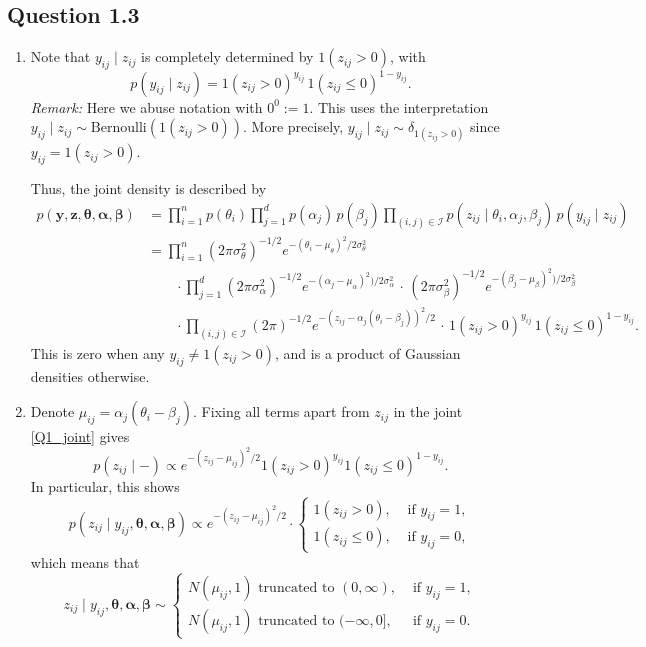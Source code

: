 \documentclass[12pt]{article}
\begin{document}
\subsection*{Question 1.3}

\begin{enumerate}[label=(\alph*)]
    \item Note that $y_{ij} \mid z_{ij}$ is completely determined by $1(z_{ij}
    > 0)$, with \[
        p(y_{ij}\mid z_{ij})
            = 1(z_{ij} > 0)^{y_{ij}}\,1(z_{ij} \leq 0)^{1 - y_{ij}}.
    \]
    \emph{Remark:} Here we abuse notation with $0^0 := 1$.
    This uses the interpretation $y_{ij}\mid z_{ij} \sim
    \text{Bernoulli}(1(z_{ij} > 0))$.
    More precisely, $y_{ij}\mid z_{ij} \sim \delta_{1(z_{ij} > 0)}$ since
    $y_{ij} = 1(z_{ij} > 0)$.

    Thus, the joint density is described by \begin{align*}
        p(\bm{y}, \bm{z}, \bm{\theta}, \bm{\alpha}, \bm{\beta})
            &= \prod_{i = 1}^n p(\theta_i) \prod_{j = 1}^d p(\alpha_j)\,p(\beta_j)
                \prod_{(i, j) \in \mathscr{I}} p(z_{ij}\mid \theta_i, \alpha_j, \beta_j)\,p(y_{ij}\mid z_{ij}) \\
            &= \prod_{i = 1}^n (2\pi\sigma_\theta^2)^{-1 /2} e^{-(\theta_i - \mu_\theta)^2 /2\sigma_\theta^2} \\
                &\qquad\cdot\prod_{j = 1}^d (2\pi\sigma_\alpha^2)^{-1 /2} e^{-(\alpha_j - \mu_\alpha)^2) /2\sigma_\alpha^2}\,\cdot\,
                    (2\pi\sigma_\beta^2)^{-1 /2} e^{-(\beta_j - \mu_\beta)^2) /2\sigma_\beta^2} \\
                &\qquad\cdot\prod_{(i, j) \in \mathscr{I}} (2\pi)^{-1 /2}e^{-(z_{ij} - \alpha_j(\theta_i - \beta_j))^2 / 2} \,\cdot\,
                    1(z_{ij} > 0)^{y_{ij}}\,1(z_{ij}\leq 0)^{1 - y_{ij}}. \tag{$\star$} \label{Q1_joint}
    \end{align*}
    This is zero when any $y_{ij} \neq 1(z_{ij} > 0)$, and is a product of
    Gaussian densities otherwise.


    \item Denote $\mu_{ij} = \alpha_j(\theta_i - \beta_j)$.
    Fixing all terms apart from $z_{ij}$ in the joint \eqref{Q1_joint} gives \[
        p(z_{ij} \mid -) \propto e^{-(z_{ij} - \mu_{ij})^2 /2} 1(z_{ij} > 0)^{y_{ij}} 1(z_{ij} \leq 0)^{1 - y_{ij}}.
    \] In particular, this shows \[
        p(z_{ij} \mid y_{ij}, \bm{\theta}, \bm{\alpha}, \bm{\beta}) 
            \propto e^{-(z_{ij} - \mu_{ij})^2 /2} \cdot \begin{cases}
                1(z_{ij} > 0), &\text{ if } y_{ij} = 1, \\
                1(z_{ij} \leq 0), &\text{ if } y_{ij} = 0,
            \end{cases}
    \] which means that \[
        z_{ij} \mid y_{ij}, \bm{\theta}, \bm{\alpha}, \bm{\beta} \sim \begin{cases}
            N(\mu_{ij}, 1)\text{ truncated to }(0, \infty), &\text{ if } y_{ij} = 1, \\
            N(\mu_{ij}, 1)\text{ truncated to }(-\infty, 0], &\text{ if } y_{ij} = 0.
        \end{cases}
    \]


\end{enumerate}
\end{document}

